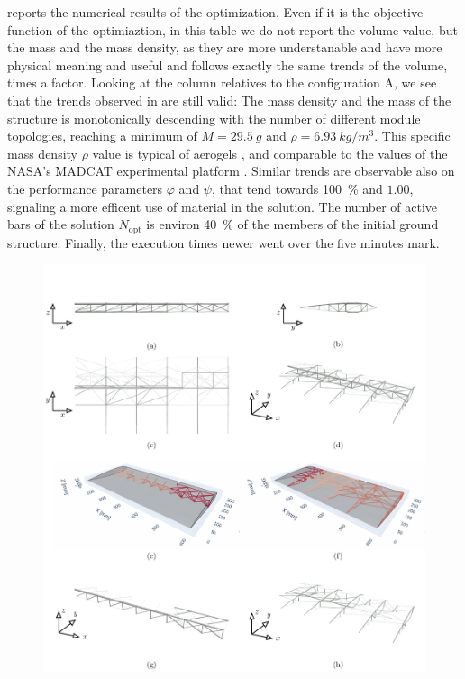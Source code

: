  reports the numerical results of the optimization. Even if it is the objective function of the optimiaztion, in this table we do not report the volume value, but the mass and the mass density, as they are more understanable and have more physical meaning and useful and follows exactly the same trends of the volume, times a factor. Looking at the column relatives to the configuration A, we see that the trends observed in  are still valid: The mass density and the mass of the structure is monotonically descending with the number of different module topologies, reaching a minimum of $M=\qty{29.5}{g}$ and $\bar{\rho}=\qty{6.93}{kg/m^3}$. This specific mass density $\bar{\rho}$ value is typical of aerogels , and comparable to the values of the NASA's MADCAT experimental platform . Similar trends are observable also on the performance parameters $\varphi$ and $\psi$, that tend towards \qty{100}{\percent} and $1.00$, signaling a more efficent use of material in the solution. The number of active bars of the solution $N_\text{opt}$ is environ \qty{40}{\percent} of the members of the initial ground structure. Finally, the execution times newer went over the five minutes mark.

\begin{figure}
    \centering
    \includegraphics[width=\linewidth]{figures/07_aeronautic/00_NACA_a_sol_3/gs_a.pdf}
        \caption{}
    \label{fig:07_naca_sol_a_nt3}
\end{figure}

